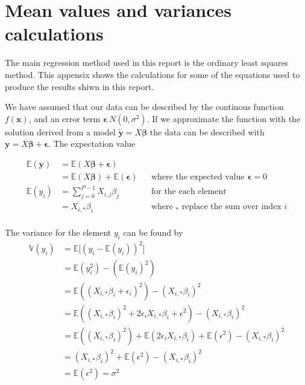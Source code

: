 \thispagestyle{plain}
\section{Mean values and variances calculations}


The main regression method used in this report is the ordinary least squares method.
This appensix shows the calculations for some of the equations used to produce the results shiwn in this report.



We have assumed that our data can be described by the continous function 
$f(\boldsymbol{x})$, and an error term $\boldsymbol{\epsilon} ~ N(0, \sigma^{2})$. 
If we approximate the function with the solution derived from a model $\boldsymbol{\tilde{y}} = X\boldsymbol{\beta}$ the data can be described with $\boldsymbol{y} = X\boldsymbol{\beta} + \boldsymbol{\epsilon}$. 
The expectation value 

\begin{align*}
    \mathbb{E}(\boldsymbol{y}) &= \mathbb{E}(X\boldsymbol{\beta} + \boldsymbol{\epsilon}) \\
    &= \mathbb{E}(X\boldsymbol{\beta}) + \mathbb{E}(\boldsymbol{\epsilon}) && \text{where the expected value $\boldsymbol{\epsilon} = 0$} \\
    \mathbb{E}(y_{i}) &= \sum_{j=0}^{P-1} X_{i,j} \beta_{j} && \text{for the each element} \\
    &= X_{i,*} \beta_{i} && \text{where $_{*}$ replace the sum over index $i$} \\
\end{align*}


The variance for the element $y_{i}$ can be found by
\begin{align*}
    \mathbb{V}(y_{i}) &= \mathbb{E} \big[ (y_{i} - \mathbb{E}(y_{i}))^{2} \big] \\
    &= \mathbb{E} (y_{i}^{2}) - (\mathbb{E}(y_{i})^{2}) \\
    &= \mathbb{E} ((X_{i,*} \beta_{i} + \epsilon_{i})^{2}) - (X_{i,*} \beta_{i})^{2} \\
    &= \mathbb{E} ((X_{i,*} \beta_{i})^{2} + 2\epsilon_{i}X_{i,*} \beta_{i} + \epsilon^{2}) - (X_{i,*} \beta_{i})^{2} \\
    &= \mathbb{E} ((X_{i,*} \beta_{i})^{2}) + \mathbb{E} (2\epsilon_{i}X_{i,*} \beta_{i}) + \mathbb{E} (\epsilon^{2}) - (X_{i,*} \beta_{i})^{2} \\
    &= (X_{i,*} \beta_{i})^{2} + \mathbb{E} (\epsilon^{2}) - (X_{i,*} \beta_{i})^{2} \\
    &= \mathbb{E} (\epsilon^{2}) = \sigma^{2} \\
\end{align*}

